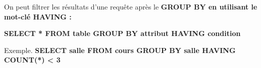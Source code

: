 \documentclass[french, 11pt]{article}
\begin{document}
\vspace*{-0.7cm}

\begin{ex}{}{}
    On peut filtrer les résultats d'une requête après le \bf{GROUP BY} en utilisant le mot-clé \bf{HAVING} :
    \begin{center}
        \bf{SELECT} * \bf{FROM} table \bf{GROUP BY} attribut \bf{HAVING} condition
    \end{center}
    Exemple. \bf{SELECT} salle \bf{FROM} cours \bf{GROUP BY} salle \bf{HAVING} \bf{COUNT}(*) < 3
\end{ex}



\fin
\end{document}
